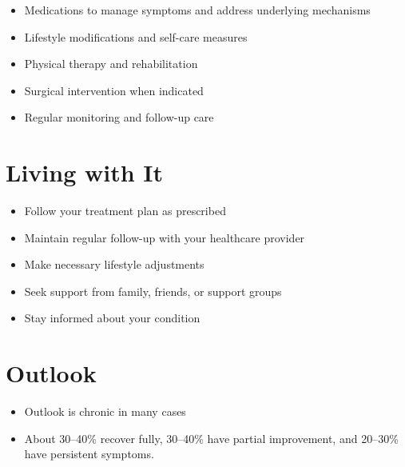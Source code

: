 \begin{itemize}[noitemsep]
  \item Medications to manage symptoms and address underlying mechanisms
  \item Lifestyle modifications and self-care measures
  \item Physical therapy and rehabilitation
  \item Surgical intervention when indicated
  \item Regular monitoring and follow-up care
\end{itemize}
\section{Living with It}
\begin{itemize}[noitemsep]
  \item Follow your treatment plan as prescribed
  \item Maintain regular follow-up with your healthcare provider
  \item Make necessary lifestyle adjustments
  \item Seek support from family, friends, or support groups
  \item Stay informed about your condition
\end{itemize}
\section{Outlook}
\begin{itemize}[noitemsep]
  \item Outlook is chronic in many cases
  \item About 30--40\% recover fully, 30--40\% have partial improvement, and 20--30\% have persistent symptoms.
\end{itemize}
